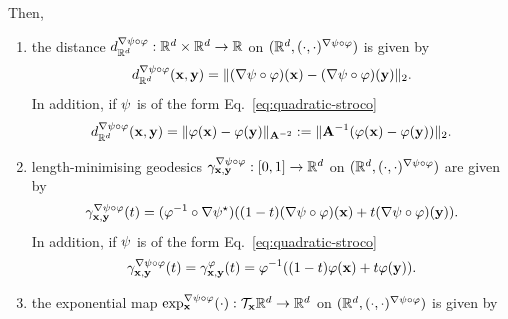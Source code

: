 \begin{proposition}
    Then,
    \begin{enumerate}[label=(\roman*)]
        \item the distance $d^{\nabla \psi \circ \varphi}_{\mathbb{R}^d}:\mathbb{R}^d \times\mathbb{R}^d \to \mathbb{R}$ on $(\mathbb{R}^d, (\cdot,\cdot)^{\nabla \psi \circ \varphi})$ is given by 
            \begin{equation}
                d^{\nabla \psi \circ \varphi}_{\mathbb{R}^d}(\mathbf{x}, \mathbf{y}) = \|(\nabla \psi \circ \varphi)(\mathbf{x}) - (\nabla \psi \circ \varphi)(\mathbf{y})\|_2.
                \label{eq:thm-distance-remetrized}
            \end{equation}
            In addition, if $\psi$ is of the form Eq.~\eqref{eq:quadratic-stroco}
            \begin{equation}
                d^{\nabla \psi \circ \varphi}_{\mathbb{R}^d}(\mathbf{x}, \mathbf{y}) = \| \varphi(\mathbf{x}) -  \varphi(\mathbf{y})\|_{\mathbf{A}^{-2}} := \| \mathbf{A}^{-1} (\varphi(\mathbf{x}) -  \varphi(\mathbf{y}))\|_{2}.
                \label{eq:thm-distance-remetrized-special-psi-}
            \end{equation}
        \item length-minimising geodesics $\gamma^{\nabla \psi \circ \varphi}_{\mathbf{x}, \mathbf{y}}:[0,1] \to \mathbb{R}^d$ on $(\mathbb{R}^d, (\cdot,\cdot)^{\nabla \psi \circ \varphi})$ are given by 
        \begin{equation}
            \gamma^{\nabla \psi \circ \varphi}_{\mathbf{x}, \mathbf{y}}(t)= (\varphi^{-1} \circ\nabla \psi^\star) ((1 - t)(\nabla \psi \circ \varphi)(\mathbf{x}) + t (\nabla \psi \circ \varphi)(\mathbf{y})).
            \label{eq:thm-geodesic-remetrized}
        \end{equation}
        In addition, if $\psi$ is of the form Eq.~\eqref{eq:quadratic-stroco}
        \begin{equation}
            \gamma^{\nabla \psi \circ \varphi}_{\mathbf{x}, \mathbf{y}}(t) = \gamma^\varphi_{\mathbf{x}, \mathbf{y}}(t) = \varphi^{-1}((1 - t)\varphi(\mathbf{x}) + t \varphi(\mathbf{y})).
            \label{eq:thm-geodesic-remetrized-special-psi-}
        \end{equation}
        \item the exponential map $\exp^{\nabla \psi \circ \varphi}_{\mathbf{x}} (\cdot):\mathcal{T}_{\mathbf{x}} \mathbb{R}^d \to \mathbb{R}^d$ on $(\mathbb{R}^d, (\cdot,\cdot)^{\nabla \psi \circ \varphi})$ is given by 
        \begin{equation}

\end{equation}
\end{enumerate}
\end{proposition}
